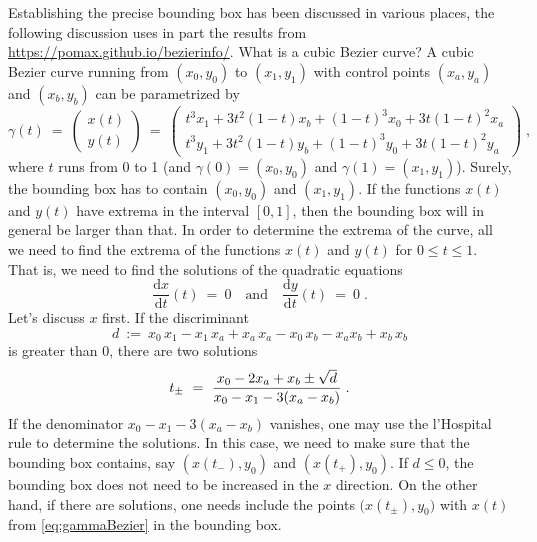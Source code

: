 Establishing the precise bounding box has been discussed in various places, the
following discussion uses in part the results from
\url{https://pomax.github.io/bezierinfo/}. What is a cubic Bezier curve? A
cubic Bezier curve running from $(x_0,y_0)$ to $(x_1,y_1)$ with control points
$(x_a,y_a)$ and $(x_b,y_b)$ can be parametrized by
\begin{equation}
 \gamma(t)~=~
 \begin{pmatrix} x(t)\\ y(t) \end{pmatrix}~=~
 \begin{pmatrix}t^3 x_{1}+3 t^2 (1-t) x_{b}+(1-t)^3
   x_{0}+3 t (1-t)^2 x_{a}\\
   t^3 y_{1}+3
   t^2 (1-t) y_{b}+(1-t)^3 y_{0}+3 t (1-t)^2
   y_{a}\end{pmatrix}\;,\label{eq:gammaBezier}
\end{equation}
where $t$ runs from 0 to 1 (and $\gamma(0)=(x_0,y_0)$ and
$\gamma(1)=(x_1,y_1)$). Surely, the bounding box has to contain
$(x_0,y_0)$ and $(x_1,y_1)$. If the functions $x(t)$ and $y(t)$ have extrema in
the interval $[0,1]$, then the bounding box will in general be larger than that.
In order to determine the extrema of the curve, all
we need to find the extrema of the functions $x(t)$ and $y(t)$ for $0\le t\le
1$. That is, we need to find the solutions of the quadratic equations
\begin{equation}
 \frac{\mathrm{d}x}{\mathrm{d}t}(t)~=~0\quad\text{and}\quad
 \frac{\mathrm{d}y}{\mathrm{d}t}(t)~=~0\;.
\end{equation}
Let's discuss $x$ first. If the discriminant
\begin{equation}
 d~:=~x_0\,x_1 - x_1\,x_a + x_a\,x_a - x_0\,x_b - x_a x_b +  x_b\,x_b
\end{equation}
is greater than 0, there are two solutions
\begin{equation}
 t_\pm~=~\frac{x_{0}-2x_{a}+x_{b}\pm\sqrt{d}}{%
 	x_{0}-x_{1}-3(x_{a}- x_{b})} \;.
\end{equation}  
If the denominator $x_{0}-x_{1}-3(x_{a}- x_{b})$  vanishes, one may use the
l'Hospital rule to determine the solutions.
In this case, we need to make sure that the bounding box contains, say
$(x(t_-),y_0)$ and $(x(t_+),y_0)$. If $d\le0$, the bounding box does not need to
be increased in the $x$ direction. On the other hand, if there are solutions,
one needs include the points $\bigl(x(t_\pm),y_0\bigr)$ with $x(t)$ from
\eqref{eq:gammaBezier} in the bounding box. 

